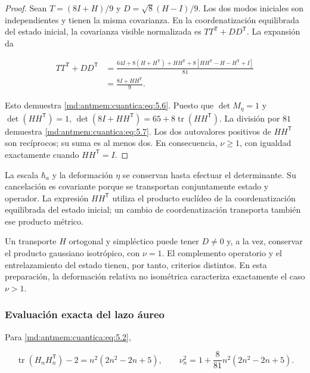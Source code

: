 \begin{proof}
Sean \(T=(8I+H)/9\) y \(D=\sqrt8(H-I)/9\). Los dos modos iniciales son independientes y tienen la misma covarianza. En la coordenatización equilibrada del estado inicial, la covarianza visible normalizada es \(TT^{\mathsf T}+DD^{\mathsf T}\). La expansión da

\[
\begin{aligned}
TT^{\mathsf T}+DD^{\mathsf T}
&=\frac{64I+8(H+H^{\mathsf T})+HH^{\mathsf T}
+8[HH^{\mathsf T}-H-H^{\mathsf T}+I]}{81}\\
&=\frac{8I+HH^{\mathsf T}}9.
\end{aligned}
\]

Esto demuestra \eqref{md:antmem:cuantica:eq:5.6}. Puesto que \(\det M_\eta=1\) y \(\det(HH^{\mathsf T})=1\),
\(\det(8I+HH^{\mathsf T})=65+8\operatorname{tr}(HH^{\mathsf T})\).
La división por \(81\) demuestra \eqref{md:antmem:cuantica:eq:5.7}. Los dos autovalores positivos de \(HH^{\mathsf T}\) son recíprocos; su suma es al menos dos. En consecuencia, \(\nu\geq1\), con igualdad exactamente cuando \(HH^{\mathsf T}=I\).
\end{proof}

La escala \(\hbar_a\) y la deformación \(\eta\) se conservan hasta efectuar el determinante. Su cancelación es covariante porque se transportan conjuntamente estado y operador. La expresión \(HH^{\mathsf T}\) utiliza el producto euclídeo de la coordenatización equilibrada del estado inicial; un cambio de coordenatización transporta también ese producto métrico.

Un transporte \(H\) ortogonal y simpléctico puede tener \(D\neq0\) y, a la vez, conservar el producto gaussiano isotrópico, con \(\nu=1\). El complemento operatorio y el entrelazamiento del estado tienen, por tanto, criterios distintos. En esta preparación, la deformación relativa no isométrica caracteriza exactamente el caso \(\nu>1\).

\subsubsection{Evaluación exacta del lazo áureo}

Para \eqref{md:antmem:cuantica:eq:5.2},

\begin{equation}
\operatorname{tr}(H_nH_n^{\mathsf T})-2
=n^2(2n^2-2n+5),\qquad
\nu_n^2=1+\frac8{81}n^2(2n^2-2n+5).
\label{md:antmem:cuantica:eq:5.8}
\end{equation}

